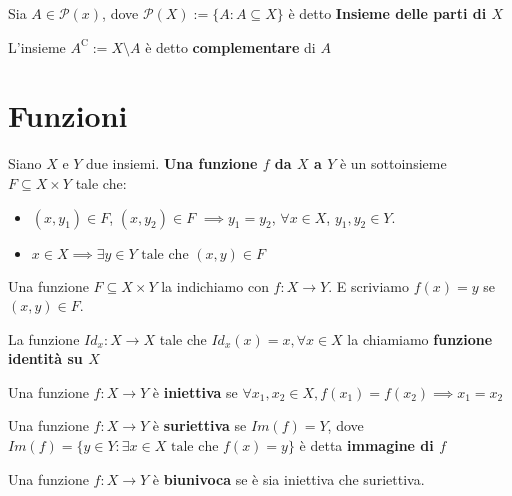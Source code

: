 \documentclass[../main.tex]{subfiles}
\begin{document}
\begin{definition}
    Sia $A \in \mathcal{P} (x)$, dove $\mathcal{P} (X) := \{ A : A \subseteq X \}$ è detto \textbf{Insieme delle parti di $X$}
\end{definition}

\begin{definition}[Complementare]
    L'insieme $A^\mathrm{C} := X \setminus A$ è detto \textbf{complementare} di $A$ %
\end{definition}

\section{Funzioni}
Siano $X$ e $Y$ due insiemi. \textbf{Una funzione $f$ da $X$ a $Y$} è un sottoinsieme $F \subseteq X \times Y$
tale che:
\begin{itemize}
    \item $(x, y_1) \in F$, $(x,y_2) \in F$ $\implies y_1 = y_2$, $\forall x \in X$, $y_1,y_2 \in Y$.
    \item $x \in X \implies \exists y \in Y \text{ tale che } (x,y) \in F$
\end{itemize}
Una funzione $F \subseteq X \times Y$ la indichiamo con $f : X \to Y$. E scriviamo $f(x) = y$ se $(x,y) \in F$.

\begin{definition}
    La funzione $Id_x : X \rightarrow X $ tale che $Id_x (x) = x, \forall x \in X$ la chiamiamo \textbf{funzione
        identità su $X$}
\end{definition}

\begin{definition}
    Una funzione $f: X \rightarrow Y$ è \textbf{iniettiva} se $\forall x_1, x_2 \in X, f(x_1) = f(x_2)
        \implies x_1 = x_2$
\end{definition}

\begin{definition}
    Una funzione $f: X \rightarrow Y$ è \textbf{suriettiva} se $Im(f) = Y$, dove $Im(f) = \{ y \in Y :
        \exists x \in X \text{ tale che } f(x) = y \}$ è detta \textbf{immagine di $f$}
\end{definition}

\begin{definition}
    Una funzione $f: X \rightarrow Y$ è \textbf{biunivoca} se è sia iniettiva che suriettiva.
\end{definition}
\end{document}
